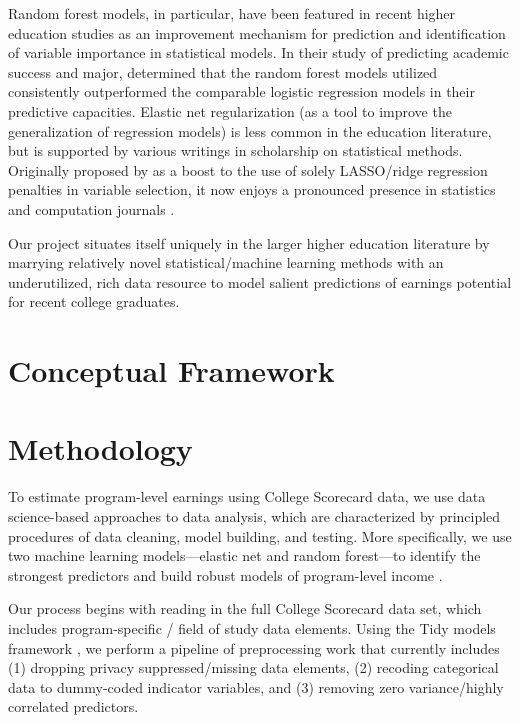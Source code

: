 \documentclass[a4paper, 12pt]{article}
\begin{document}
Random forest models, in particular, have been featured in recent higher education studies as an improvement mechanism for prediction and identification of variable importance in statistical models. In their study of predicting academic success and major, \textcite{beaulacrosenthal_2019} determined that the random forest models utilized consistently outperformed the comparable logistic regression models in their predictive capacities. Elastic net regularization (as a tool to improve the generalization of regression models) is less common in the education literature, but is supported by various writings in scholarship on statistical methods. Originally proposed by \textcite{zouhastie_2005} as a boost to the use of solely LASSO/ridge regression penalties in variable selection, it now enjoys a pronounced presence in statistics and computation journals \parencite{zouzhang_2009, lilin_2010}.

Our project situates itself uniquely in the larger higher education literature by marrying relatively novel statistical/machine learning methods with an underutilized, rich data resource to model salient predictions of earnings potential for recent college graduates.

\section*{Conceptual Framework}

\section*{Methodology}

To estimate program-level earnings using College Scorecard data, we use data science-based approaches to data analysis, which are characterized by principled procedures of data cleaning, model building, and testing. More specifically, we use two machine learning models---elastic net and random forest---to identify the strongest predictors and build robust models of program-level income \parencite{Hastie_etal_2016, Kuhn_Silge_2022}.

Our process begins with reading in the full College Scorecard data set, which includes program-specific / field of study data elements. Using the Tidy models framework \parencite{Kuhn_Silge_2022}, we perform a pipeline of preprocessing work that currently includes (1) dropping privacy suppressed/missing data elements, (2) recoding categorical data to dummy-coded indicator variables, and (3) removing zero variance/highly correlated predictors.
\end{document}
